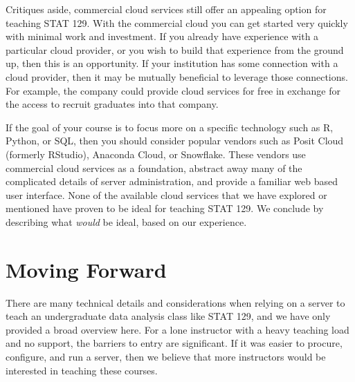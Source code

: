 \documentclass[12pt]{article}
\begin{document}
Critiques aside, commercial cloud services still offer an appealing option for teaching STAT 129.
With the commercial cloud you can get started very quickly with minimal work and investment.
If you already have experience with a particular cloud provider, or you wish to build that experience from the ground up, then this is an opportunity. 
If your institution has some connection with a cloud provider, then it may be mutually beneficial to leverage those connections.
For example, the company could provide cloud services for free in exchange for the access to recruit graduates into that company.

If the goal of your course is to focus more on a specific technology such as R, Python, or SQL, then you should consider popular vendors such as Posit Cloud (formerly RStudio), Anaconda Cloud, or Snowflake.
These vendors use commercial cloud services as a foundation, abstract away many of the complicated details of server administration, and provide a familiar web based user interface.
None of the available cloud services that we have explored or mentioned have proven to be ideal for teaching STAT 129.
We conclude by describing what \emph{would} be ideal, based on our experience.

\section{Moving Forward}
\label{sec:conclusion}

There are many technical details and considerations when relying on a server to teach an undergraduate data analysis class like STAT 129, and we have only provided a broad overview here.
For a lone instructor with a heavy teaching load and no support, the barriers to entry are significant.
If it was easier to procure, configure, and run a server, then we believe that more instructors would be interested in teaching these courses.
\end{document}
